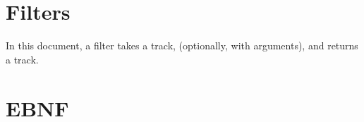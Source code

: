 \documentclass[10pt, twoside]{article}
\newcommand{\secname}{}
\let\stdsection\section
\newcommand{\newsection}[1]{\clearpage\setcounter{numpar}{0}\stdsection{#1}\renewcommand{\secname}{#1}}
\renewcommand{\section}{\clearpage\setcounter{numpar}{0}\stdsection}
\newcounter{numpar}
\begin{document}
\tableofcontents

\renewcommand\section{\newsection}












\section{Filters}

In this document, a filter takes a track, (optionally, with arguments), and returns a track.

\section{EBNF}
\renewcommand{\section}{\clearpage\setcounter{numpar}{0}\stdsection}
\end{document}
